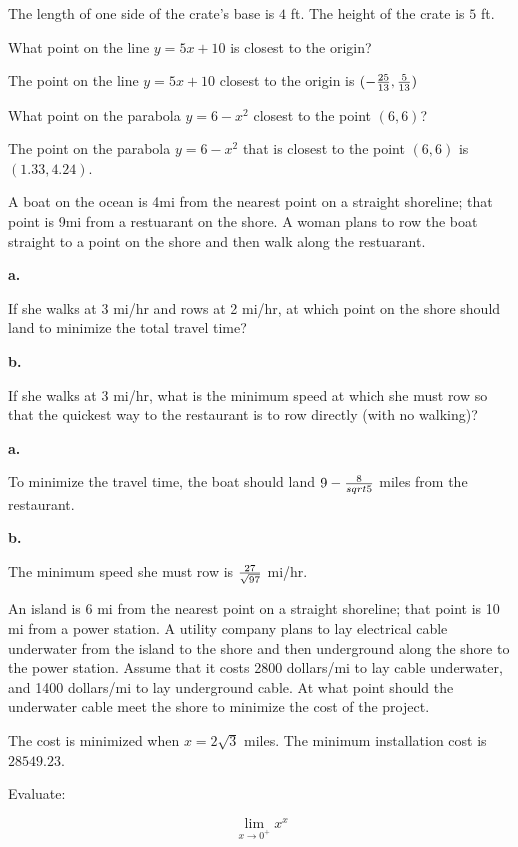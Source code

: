 The length of one side of the crate's base is $4$ ft. The
height of the crate is $5$ ft.

What point on the line $y = 5x + 10$ is closest to the origin?

The point on the line $y = 5x + 10$ closest to the origin is
$(-{25 \over 13}, {5 \over 13})$

What point on the parabola $y = 6 - x^2$ closest to the point $(6, 6)$?

The point on the parabola $y = 6 - x^2$ that is closest to the point
$(6,6)$ is $(1.33, 4.24)$.

A boat on the ocean is 4mi from the nearest point on a straight
shoreline; that point is 9mi from a restuarant on the shore.
A woman plans to row the boat straight to a point on the shore
and then walk along the restuarant.

{\par \bf a.}
If she walks at 3 mi/hr and rows at 2 mi/hr, at which point on
the shore should land to minimize the total travel time?

{\par \bf b.}
If she walks at 3 mi/hr, what is the minimum speed at which
she must row so that the quickest way to the restaurant is to
row directly (with no walking)?

{\par \bf a.}
To minimize the travel time, the boat should land $9 - {8 \over sqrt{5}}$ miles
from the restaurant.

{\par \bf b.}
The minimum speed she must row is ${27 \over \sqrt{97}}$ mi/hr.

An island is 6 mi from the nearest point on a straight shoreline;
that point is 10 mi from a power station. A utility company plans
to lay electrical cable underwater from the island to the
shore and then underground along the shore to the power station.
Assume that it costs 2800 dollars/mi to lay cable underwater,
and 1400 dollars/mi to lay underground cable. At what point
should the underwater cable meet the shore to minimize the cost
of the project.

The cost is minimized when $x = 2\sqrt{3}$ miles.
The minimum installation cost is $28549.23$.

Evaluate:

$$\
\lim_{x \to 0^+} x^x
$$

